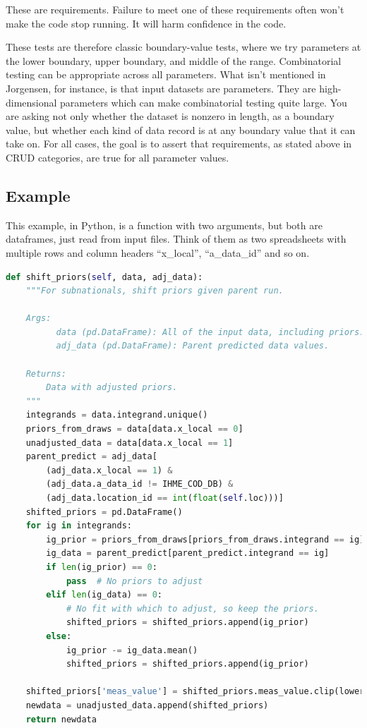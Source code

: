 \documentclass[fleqn,10pt]{olplainarticle}
\begin{document}
These are requirements. Failure to meet one of these requirements
often won't make the code stop running. It will harm confidence
in the code.

These tests are therefore classic boundary-value tests, where
we try parameters at the lower boundary, upper boundary,
and middle of the range. Combinatorial testing can be appropriate
across all parameters. What isn't mentioned in Jorgensen, for instance,
is that input datasets are parameters. They are high-dimensional
parameters which can make combinatorial testing quite large.
You are asking not only whether the dataset is nonzero in length,
as a boundary value, but whether each kind of data record is at
any boundary value that it can take on. For all cases, the goal
is to assert that requirements, as stated above in CRUD categories,
are true for all parameter values.

\subsection{Example}
This example, in Python, is a function with two arguments, but both
are dataframes, just read from input files. Think of them as two spreadsheets
with multiple rows and column headers ``x\_local'', ``a\_data\_id''
and so on.
\begin{lstlisting}[language=Python]
def shift_priors(self, data, adj_data):
    """For subnationals, shift priors given parent run.

    Args:
          data (pd.DataFrame): All of the input data, including priors.
          adj_data (pd.DataFrame): Parent predicted data values.

    Returns:
        Data with adjusted priors.
    """
    integrands = data.integrand.unique()
    priors_from_draws = data[data.x_local == 0]
    unadjusted_data = data[data.x_local == 1]
    parent_predict = adj_data[
        (adj_data.x_local == 1) &
        (adj_data.a_data_id != IHME_COD_DB) &
        (adj_data.location_id == int(float(self.loc)))]
    shifted_priors = pd.DataFrame()
    for ig in integrands:
        ig_prior = priors_from_draws[priors_from_draws.integrand == ig]
        ig_data = parent_predict[parent_predict.integrand == ig]
        if len(ig_prior) == 0:
            pass  # No priors to adjust
        elif len(ig_data) == 0:
            # No fit with which to adjust, so keep the priors.
            shifted_priors = shifted_priors.append(ig_prior)
        else:
            ig_prior -= ig_data.mean()
            shifted_priors = shifted_priors.append(ig_prior)

    shifted_priors['meas_value'] = shifted_priors.meas_value.clip(lower=0)
    newdata = unadjusted_data.append(shifted_priors)
    return newdata
\end{lstlisting}
\end{document}
